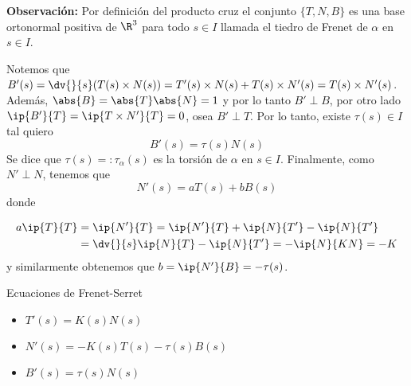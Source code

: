 \documentclass{article}
\begin{document}
\noindent\textbf{Observación:} Por definición del producto cruz el conjunto $\{T,N,B\}$ es una base
ortonormal positiva de $\R^{3}$ para todo $s\in I$ llamada el tiedro de Frenet de $\alpha$ en 
$s\in I$.
\vspace{4mm}

\noindent Notemos que $B'(s)=\dv{}{s}(T(s)\times N(s))=T'(s)\times N(s)+T(s)\times N'(s)=
T(s)\times N'(s)$. Además, $\abs{B}=\abs{T}\abs{N}=1$ y por lo tanto $B'\perp B$, por otro lado
$\ip{B'}{T}=\ip{T\times N'}{T}=0$, osea $B'\perp T$. Por lo tanto, existe $\tau(s)\in I$ tal quiero
\begin{equation*}
    B'(s)=\tau(s)N(s)
\end{equation*}
Se dice que $\tau(s)=:\tau_{\alpha}(s)$ es la torsión de $\alpha$ en $s\in I$. Finalmente, como
$N'\perp N$, tenemos que
\begin{equation*}
    N'(s)=aT(s)+bB(s)
\end{equation*}
donde

\begin{align*}
    a\ip{T}{T} &= \ip{N'}{T}=\ip{N'}{T}+\ip{N}{T'}-\ip{N}{T'} \\
    &= \dv{}{s}\ip{N}{T}-\ip{N}{T'}=-\ip{N}{KN}=-K
\end{align*}
y similarmente obtenemos que $b=\ip{N'}{B}=-\tau(s)$.

\begin{prop}
    Ecuaciones de Frenet-Serret
    \begin{itemize}
        \item $T'(s)=K(s)N(s)$
        \item $N'(s)=-K(s)T(s)-\tau(s) B(s)$
        \item $B'(s)=\tau(s) N(s)$
    \end{itemize}
\end{prop}
\end{document}
